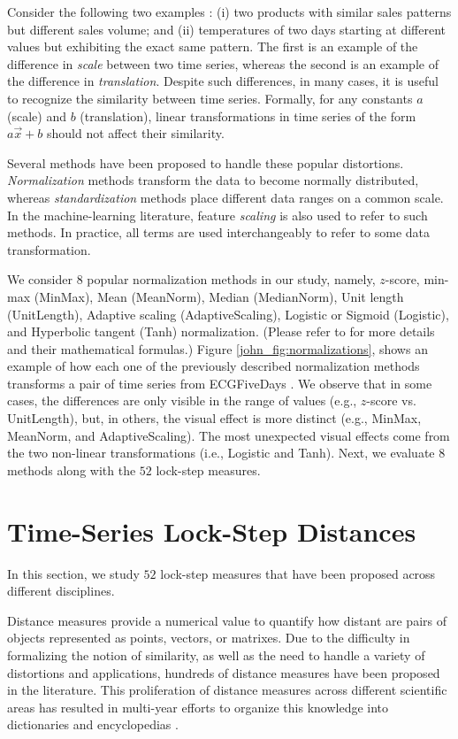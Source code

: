 \documentclass[11pt]{article}
\begin{document}
Consider the following two examples \cite{goldin1995similarity}: (i) two products with similar sales patterns but different sales volume; and (ii) temperatures of two days starting at different values but exhibiting the exact same pattern. The first is an example of the difference in {\em scale} between two time series, whereas the second is an example of the difference in {\em translation}. Despite such differences, in many cases, it is useful to recognize the similarity between time series. Formally, for any constants $a$ (scale) and $b$ (translation), linear transformations in time series of the form $a\vec{x}+b$ should not affect their similarity. 

Several methods have been proposed to handle these popular distortions. {\em Normalization} methods transform the data to become normally distributed, whereas {\em standardization} methods place different data ranges on a common scale. In the machine-learning literature, feature {\em scaling} is also used to refer to such methods. In practice, all terms are used interchangeably to refer to some data transformation. 

We consider $8$ popular normalization methods in our study, namely, $z$-score, min-max (MinMax), Mean (MeanNorm), Median (MedianNorm), Unit length (UnitLength), Adaptive scaling (AdaptiveScaling), Logistic or Sigmoid (Logistic), and Hyperbolic tangent (Tanh) normalization. (Please refer to \cite{paparrizos2020debunking} for more details and their mathematical formulas.) Figure \ref{john_fig:normalizations}, shows an example of how each one of the previously described normalization methods transforms a pair of time series from ECGFiveDays \cite{UCRArchive2018}. We observe that in some cases, the differences are only visible in the range of values (e.g., $z$-score vs. UnitLength), but, in others, the visual effect is more distinct (e.g., MinMax, MeanNorm, and AdaptiveScaling). The most unexpected visual effects come from the two non-linear transformations (i.e., Logistic and Tanh). Next, we evaluate $8$ methods along with the $52$ lock-step measures.

\section{Time-Series Lock-Step Distances}
\label{john_sec:lockstep}

In this section, we study $52$ lock-step measures that have been proposed across different disciplines.

Distance measures provide a numerical value to quantify how distant are pairs of objects represented as points, vectors, or matrixes. Due to the difficulty in formalizing the notion of similarity, as well as the need to handle a variety of distortions and applications, hundreds of distance measures have been proposed in the literature. This proliferation of distance measures across different scientific areas has resulted in multi-year efforts to organize this knowledge into dictionaries \cite{deza2006dictionary} and encyclopedias \cite{deza2009encyclopedia}. 
\end{document}
